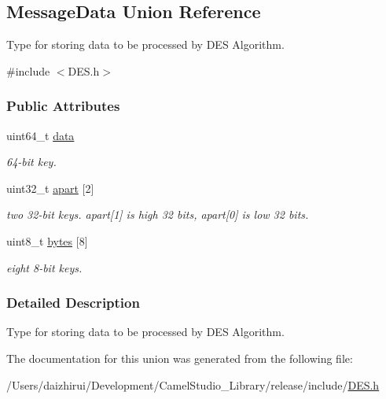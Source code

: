 \hypertarget{a00138}{}\subsection{Message\+Data Union Reference}
\label{a00138}


Type for storing data to be processed by D\+ES Algorithm.  




{\ttfamily \#include $<$D\+E\+S.\+h$>$}

\subsubsection*{Public Attributes}
\begin{DoxyCompactItemize}
\item 
\mbox{\label{a00138_a2cf9dd28d0679205048930fe98fa116b}} 
uint64\+\_\+t \mbox{\hyperlink{a00138_a2cf9dd28d0679205048930fe98fa116b}{data}}
\begin{DoxyCompactList}\small\item\em 64-\/bit key. \end{DoxyCompactList}\item 
\mbox{\label{a00138_a43406dd2e72f1230b8f70551a96699c5}} 
uint32\+\_\+t \mbox{\hyperlink{a00138_a43406dd2e72f1230b8f70551a96699c5}{apart}} \mbox{[}2\mbox{]}
\begin{DoxyCompactList}\small\item\em two 32-\/bit keys. apart\mbox{[}1\mbox{]} is high 32 bits, apart\mbox{[}0\mbox{]} is low 32 bits. \end{DoxyCompactList}\item 
\mbox{\label{a00138_aaceaebf6f0349dae52e2c1c2a462b654}} 
uint8\+\_\+t \mbox{\hyperlink{a00138_aaceaebf6f0349dae52e2c1c2a462b654}{bytes}} \mbox{[}8\mbox{]}
\begin{DoxyCompactList}\small\item\em eight 8-\/bit keys. \end{DoxyCompactList}\end{DoxyCompactItemize}


\subsubsection{Detailed Description}
Type for storing data to be processed by D\+ES Algorithm. 

The documentation for this union was generated from the following file\+:\begin{DoxyCompactItemize}
\item 
/\+Users/daizhirui/\+Development/\+Camel\+Studio\+\_\+\+Library/release/include/\mbox{\hyperlink{a00005}{D\+E\+S.\+h}}\end{DoxyCompactItemize}
